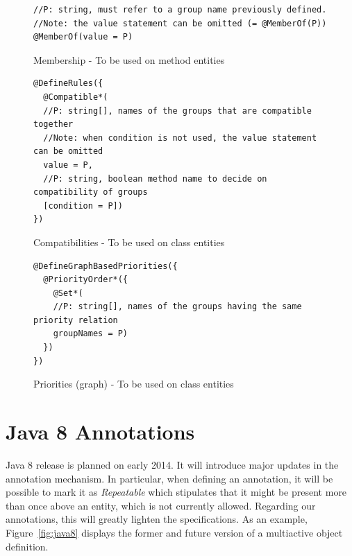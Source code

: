 \documentclass[11pt]{report}
\begin{document}
\newpage

\begin{figure}[t]
	\lstset{language=java, numbers=left, numberstyle=\tiny, stepnumber=1, numbersep=5pt, basicstyle=\footnotesize}
	\begin{lstlisting}[frame=single]
//P: string, must refer to a group name previously defined. 
//Note: the value statement can be omitted (= @MemberOf(P))
@MemberOf(value = P)
 	\end{lstlisting}
\caption{Membership - To be used on method entities}
\label{fig:memebership}
\end{figure}

\begin{figure}[t]
	\lstset{language=java, numbers=left, numberstyle=\tiny, stepnumber=1, numbersep=5pt, basicstyle=\footnotesize}
	\begin{lstlisting}[frame=single]
@DefineRules({
  @Compatible*(
  //P: string[], names of the groups that are compatible together
  //Note: when condition is not used, the value statement can be omitted
  value = P,
  //P: string, boolean method name to decide on compatibility of groups
  [condition = P])
})
 	\end{lstlisting}
\caption{Compatibilities - To be used on class entities}
\label{fig:compatibilities}
\end{figure}

\begin{figure}[t]
	\lstset{language=java, numbers=left, numberstyle=\tiny, stepnumber=1, numbersep=5pt, basicstyle=\footnotesize}
	\begin{lstlisting}[frame=single]
@DefineGraphBasedPriorities({
  @PriorityOrder*({
    @Set*(
    //P: string[], names of the groups having the same priority relation
    groupNames = P)
  })
})
 	\end{lstlisting}
\caption{Priorities (graph) - To be used on class entities}
\label{fig:priorities}
\end{figure}

\chapter{Java 8 Annotations}

Java 8 release is planned on early 2014. It will introduce major updates in the annotation mechanism. In particular, when defining an annotation, it will be possible to mark it as \emph{Repeatable} which stipulates that it might be present more than once above an entity, which is not currently allowed. Regarding our annotations, this will greatly lighten the specifications. As an example, Figure~\ref{fig:java8} displays the former and future version of a multiactive object definition.
\end{document}
